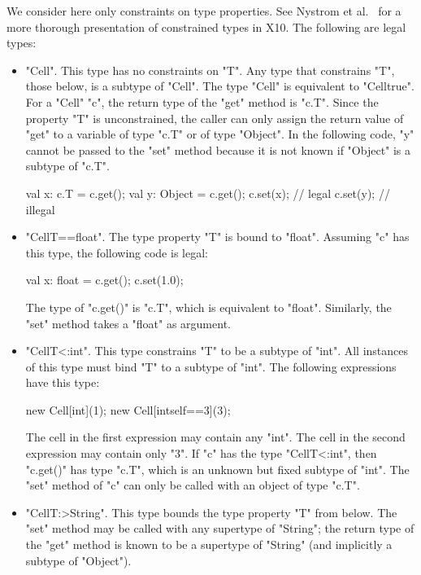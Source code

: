 \documentclass[nocopyrightspace,9pt]{sigplanconf}
\begin{document}
We consider here only constraints on type properties. 
See Nystrom et al.~\cite{constrained-types} for a more thorough
presentation of constrained types in X10.
The following are legal types:
\begin{itemize}
\item \xcd"Cell".  This type has no constraints on \xcd"T".
Any type that constrains \xcd"T", those below,
is a subtype of \xcd"Cell".  The type \xcd"Cell" is equivalent to
\xcd"Cell{true}".
%
For a \xcd"Cell" \xcd"c", the return type of the \xcd"get" method 
is \xcd"c.T".  
Since the property \xcd"T" is unconstrained,  
the caller can only assign the return value of \xcd"get"
to a variable of type \xcd"c.T" or of type \xcd"Object".
In the following code, \xcd"y" cannot be passed to the \xcd"set" method
because it is not known if \xcd"Object" is a subtype of \xcd"c.T".
\begin{xten}
val x: c.T = c.get();
val y: Object = c.get();
c.set(x); // legal
c.set(y); // illegal
\end{xten}

\item \xcd"Cell{T==float}".
The type property \xcd"T" is bound to \xcd"float".
Assuming \xcd"c" has this type, the following code is legal:
\begin{xten}
val x: float = c.get();
c.set(1.0);
\end{xten}
The type of \xcd"c.get()" is \xcd"c.T", which is equivalent to
\xcd"float".
Similarly, the \xcd"set" method takes a \xcd"float" as argument.

\item \xcd"Cell{T<:int}".
This type constrains \xcd"T" to be a subtype of \xcd"int".
All instances of this type must bind \xcd"T" to a subtype of \xcd"int".
The following expressions have this type:
\begin{xten}
new Cell[int](1);
new Cell[int{self==3}](3);
\end{xten}
The cell in the first expression may contain any \xcd"int".
The cell in the second expression may contain only \xcd"3".
%
If \xcd"c" has the type \xcd"Cell{T<:int}",
then \xcd"c.get()" has type \xcd"c.T", which is an unknown but
fixed subtype of \xcd"int".  The \xcd"set" method of \xcd"c" can
only be called with an object of type \xcd"c.T".

\item \xcd"Cell{T:>String}".  This type bounds the type property
\xcd"T"
from below.  The \xcd"set" method may be called with any
supertype of \xcd"String"; the return type of the \xcd"get"
method is known to be a
supertype of \xcd"String" (and implicitly a subtype of \xcd"Object").
\end{itemize}
\end{document}
